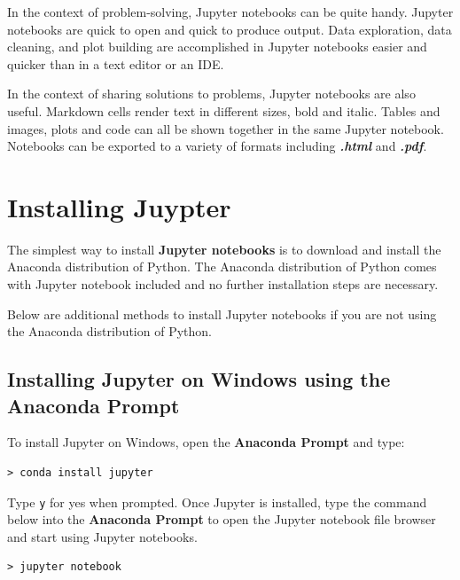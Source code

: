 \documentclass{book}
\begin{document}
    
        In the context of problem-solving, Jupyter notebooks can be quite handy.
Jupyter notebooks are quick to open and quick to produce output. Data
exploration, data cleaning, and plot building are accomplished in
Jupyter notebooks easier and quicker than in a text editor or an IDE.

In the context of sharing solutions to problems, Jupyter notebooks are
also useful. Markdown cells render text in different sizes, bold and
italic. Tables and images, plots and code can all be shown together in
the same Jupyter notebook. Notebooks can be exported to a variety of
formats including \textbf{\emph{.html}} and \textbf{\emph{.pdf}}.
    




    
        \section{Installing Juypter}\label{installing-juypter}
    




    
        The simplest way to install \textbf{Jupyter notebooks} is to download
and install the Anaconda distribution of Python. The Anaconda
distribution of Python comes with Jupyter notebook included and no
further installation steps are necessary.

Below are additional methods to install Jupyter notebooks if you are not
using the Anaconda distribution of Python.
    




    
        \subsection{Installing Jupyter on Windows using the Anaconda
Prompt}\label{installing-jupyter-on-windows-using-the-anaconda-prompt}

To install Jupyter on Windows, open the \textbf{Anaconda Prompt} and
type:

\begin{lstlisting}
> conda install jupyter
\end{lstlisting}

Type \lstinline!y! for yes when prompted. Once Jupyter is installed,
type the command below into the \textbf{Anaconda Prompt} to open the
Jupyter notebook file browser and start using Jupyter notebooks.

\begin{lstlisting}
> jupyter notebook
\end{lstlisting}
    
\end{document}
